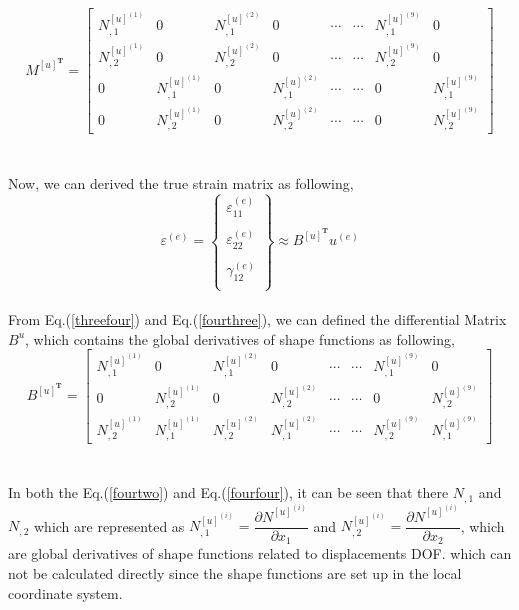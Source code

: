 \documentclass[12pt]{article}
\begin{document}
\begin{equation}\label{fourtwo}
M^{[u]^\textbf{T}}=
\begin{bmatrix}
N_{,1}^{[u]^{(1)}}&0&N_{,1}^{[u]^{(2)}}&0&\cdots &\cdots& N_{,1}^{[u]^{(9)}}&0 \\
N_{,2}^{[u]^{(1)}}&0&N_{,2}^{[u]^{(2)}}&0&\cdots &\cdots& N_{,2}^{[u]^{(9)}}&0 \\
0&N_{,1}^{[u]^{(1)}}&0&N_{,1}^{[u]^{(2)}}&\cdots &\cdots& 0&N_{,1}^{[u]^{(9)}} \\
0&N_{,2}^{[u]^{(1)}}&0&N_{,2}^{[u]^{(2)}}&\cdots &\cdots& 0&N_{,2}^{[u]^{(9)}}
\end{bmatrix}
\end{equation}
\\
\\
Now, we can derived the true strain matrix as following,
\begin{equation}\label{fourthree}
\varepsilon^{(e)}=
\begin{Bmatrix}
\varepsilon_{11}^{(e)} \\
\\
\varepsilon_{22}^{(e)}  \\
\\
\gamma_{12}^{(e)}  \\ 
\end{Bmatrix}
\approx B^{[u]^{\textbf{T}}}u^{(e)}
\end{equation}
\\
From Eq.(\ref{threefour}) and Eq.(\ref{fourthree}), we can defined the differential Matrix $B^u$, which contains the global derivatives of shape functions as following, 
\begin{equation}\label{fourfour}
B^{[u]^\textbf{T}}=
\begin{bmatrix}
	N_{,1}^{[u]^{(1)}}&0&N_{,1}^{[u]^{(2)}}&0&\cdots &\cdots& N_{,1}^{[u]^{(9)}}&0 \\
	0&N_{,2}^{[u]^{(1)}}&0&N_{,2}^{[u]^{(2)}}&\cdots &\cdots& 0&N_{,2}^{[u]^{(9)}} \\
	N_{,2}^{[u]^{(1)}}&N_{,1}^{[u]^{(1)}}&N_{,2}^{[u]^{(2)}}&N_{,1}^{[u]^{(2)}}&\cdots &\cdots& N_{,2}^{[u]^{(9)}}&N_{,1}^{[u]^{(9)}}
\end{bmatrix}
\end{equation}
\\
\\
In both the Eq.(\ref{fourtwo}) and Eq.(\ref{fourfour}), it can be seen that there $N_{,1}$ and $N_{,2}$ which are represented as $N_{,1}^{[u]^{(i)}} = \dfrac{\partial N^{[u]^{(i)}}}{\partial x_1}$ and $N_{,2}^{[u]^{(i)}} = \dfrac{\partial N^{[u]^{(i)}}}{\partial x_2}$, which are global derivatives of shape functions related to displacements DOF. which can not be calculated directly since the shape functions are set up in the local coordinate system.
\end{document}
